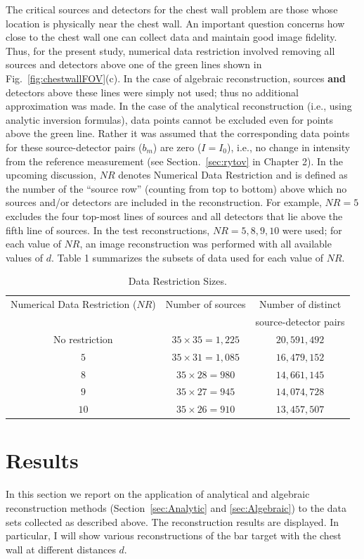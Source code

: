 The critical sources and detectors for the chest wall problem are those whose location is physically near the chest wall. An important question concerns how close to the chest wall one can collect data and maintain good image fidelity. Thus, for the present study, numerical data restriction involved removing all sources and detectors above one of the green lines shown in Fig.~\ref{fig:chestwallFOV}(c). In the case of algebraic reconstruction, sources \textbf{and} detectors above these lines were simply not used; thus no additional approximation was made.  In the case of the analytical reconstruction (i.e., using analytic inversion formulas), data points cannot be excluded even for points above the green line. Rather it was assumed that the corresponding data points for these source-detector pairs ($b_m$) are zero ($I=I_0$), i.e., no change in intensity from the reference measurement (see Section.~\ref{sec:rytov} in Chapter 2). In the upcoming discussion, $NR$ denotes Numerical Data Restriction and is defined as the number of the “source row” (counting from top to bottom) above which no sources and/or detectors are included in the reconstruction. For example, $NR=5$ excludes the four top-most lines of sources and all detectors that lie above the fifth line of sources. In the test reconstructions, $NR=5, 8, 9, 10$ were used; for each value of $NR$, an image reconstruction was performed with all available values of $d$. Table 1 summarizes the subsets of data used for each value of $NR$. 
\begin{table}[t]
\centering\caption{Data Restriction Sizes.}
\begin{tabular}{|c|c|c|}
\hline 
Numerical Data Restriction ($NR$) & Number of sources & 
Number of distinct \\
&& source-detector pairs \\ \hline
No restriction & $35\times35=1,225$ & $20,591,492$ \\
           $5$ & $35\times31=1,085$ & $16,479,152$ \\
           $8$ & $35\times28=980$  & $14,661,145$ \\
           $9$ & $35\times27=945$  & $14,074,728$ \\
          $10$ & $35\times26=910$  & $13,457,507$ \\ \hline
\end{tabular}
\end{table}

\section{Results}
\label{sec:3_results}
In this section we report on the application of analytical and algebraic reconstruction methods (Section~\ref{sec:Analytic} and \ref{sec:Algebraic}) to the data sets collected as described above. The reconstruction results are displayed. In particular, I will show various reconstructions of the bar target with the chest wall at different distances $d$. 

